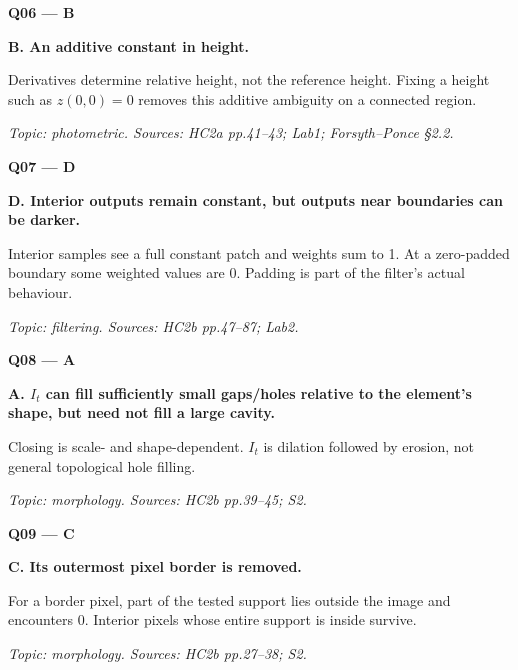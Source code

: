\documentclass[11pt,a4paper]{article}
\begin{document}
\par\vspace{12pt}
\begin{minipage}{\linewidth}
\textbf{Q06 — B}\par\smallskip
\textbf{B. An additive constant in height.}\par
Derivatives determine relative height,\allowbreak{} not the reference height. Fixing a height such as \(z(0,0)=0\) removes this additive ambiguity on a connected region.\par
{\small\itshape Topic: photometric. Sources: HC2a pp.41–43; Lab1; Forsyth–Ponce §2.2.}

\end{minipage}
\par\vspace{12pt}
\begin{minipage}{\linewidth}
\textbf{Q07 — D}\par\smallskip
\textbf{D. Interior outputs remain constant,\allowbreak{} but outputs near boundaries can be darker.}\par
Interior samples see a full constant patch and weights sum to 1. At a zero-padded boundary some weighted values are 0. Padding is part of the filter's actual behaviour.\par
{\small\itshape Topic: filtering. Sources: HC2b pp.47–87; Lab2.}

\end{minipage}
\par\vspace{12pt}
\begin{minipage}{\linewidth}
\textbf{Q08 — A}\par\smallskip
\textbf{A. \(I_t\) can fill sufficiently small gaps/\allowbreak{}holes relative to the element's shape,\allowbreak{} but need not fill a large cavity.}\par
Closing is scale- and shape-dependent. \(I_t\) is dilation followed by erosion,\allowbreak{} not general topological hole filling.\par
{\small\itshape Topic: morphology. Sources: HC2b pp.39–45; S2.}

\end{minipage}
\par\vspace{12pt}
\begin{minipage}{\linewidth}
\textbf{Q09 — C}\par\smallskip
\textbf{C. Its outermost pixel border is removed.}\par
For a border pixel,\allowbreak{} part of the tested support lies outside the image and encounters 0. Interior pixels whose entire support is inside survive.\par
{\small\itshape Topic: morphology. Sources: HC2b pp.27–38; S2.}

\end{minipage}
\end{document}
